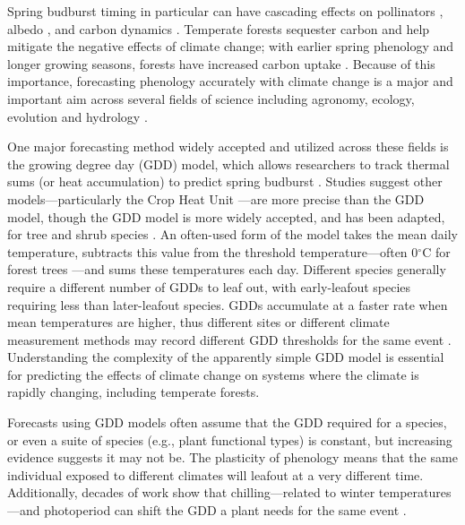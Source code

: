 \documentclass{article}\usepackage[]{graphicx}\usepackage[]{color}
\begin{document}
Spring budburst timing in particular can have cascading effects on pollinators \citep{Boggs2012, Pardee2017}, albedo \citep{Williamson2016}, and carbon dynamics \citep{Richardson2013}. Temperate forests sequester carbon and help mitigate the negative effects of climate change; with earlier spring phenology and longer growing seasons, forests have increased carbon uptake \citep{Keenan2014}. Because of this importance, forecasting phenology accurately with climate change is a major and important aim across several fields of science including agronomy, ecology, evolution and hydrology \citep{Moorcroft2001,Bolton2013,Yu2016,Taylor2020}. 
  
One major forecasting method widely accepted and utilized across these fields is the growing degree day (GDD) model, which allows researchers to track thermal sums (or heat accumulation) to predict spring budburst \citep{Schwartz2006,Vitasse2011,Cook2012,Phillimore2013,Crimmins2020}. Studies suggest other models---particularly the Crop Heat Unit \citep{Kumudini2014,Abendroth2019}---are more precise than the GDD model, though the GDD model is more widely accepted, and has been adapted, for tree and shrub species \citep{Yu2016,Klosterman2018,Montgomery2020}. An often-used form of the model takes the mean daily temperature, subtracts this value from the threshold temperature---often 0$^{\circ}$C for forest trees \citep[as estimates are proven to be more accurate,][]{Man2010}---and sums these temperatures each day. Different species generally require a different number of GDDs to leaf out, with early-leafout species requiring less than later-leafout species. GDDs accumulate at a faster rate when mean temperatures are higher, thus different sites or different climate measurement methods may record different GDD thresholds for the same event \citep{Bonhomme2000}. Understanding the complexity of the apparently simple GDD model is essential for predicting the effects of climate change on systems where the climate is rapidly changing, including temperate forests. 

Forecasts using GDD models often assume that the GDD required for a species, or even a suite of species (e.g., plant functional types) is constant, but increasing evidence suggests it may not be. The plasticity of phenology means that the same individual exposed to different climates will leafout at a very different time. Additionally, decades of work show that chilling---related to winter temperatures---and photoperiod can shift the GDD a plant needs for the same event \citep{Basler2012,Chuine2010,Zohner2016}. 
\end{document}
